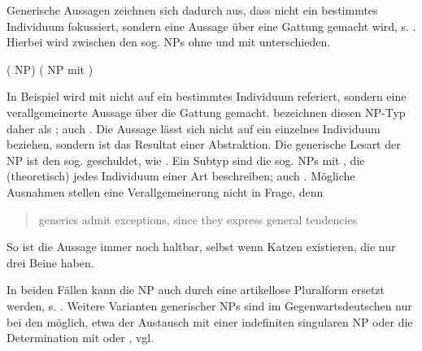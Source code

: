 
Generische Aussagen zeichnen sich dadurch aus, dass nicht ein bestimmtes Individuum fokussiert, sondern eine Aussage über eine Gattung gemacht wird, s.  \parencite[übersetzt und gekürzt aus][]{Krifka1995}. Hierbei wird zwischen den sog.  NPs ohne und mit  unterschieden.   

\begin{exe}
	\ex \label{ex:gener}   
	\begin{xlist}
		\ex \label{ex:sued} ( NP)
		\ex \label{ex:vitc}  ( NP mit )
		\end{xlist}
\end{exe}

In Beispiel  wird mit  nicht auf ein bestimmtes Individuum referiert, sondern eine verallgemeinerte Aussage über die Gattung  gemacht. \textcite[2]{Krifka1995} bezeichnen diesen NP-Typ daher als ; auch  \parencite[138]{Bisle-Muller1991}. Die Aussage lässt sich nicht auf ein einzelnes Individuum beziehen, sondern ist das Resultat einer Abstraktion. Die generische Lesart der NP ist den sog.  geschuldet, wie  \parencite{Krifka1995}. Ein Subtyp sind die sog.  NPs mit , die (theoretisch) jedes Individuum einer Art beschreiben; auch   \parencite[139f.]{Bisle-Muller1991}. Mögliche Ausnahmen stellen eine Verallgemeinerung nicht in Frage, denn  \blockcquote[179]{Lyons1999}{generics admit exceptions, since they express general tendencies}. So ist die Aussage   immer noch haltbar, selbst wenn Katzen existieren, die nur drei Beine haben.

In beiden Fällen kann die NP auch durch eine artikellose Pluralform ersetzt werden, s. . 
Weitere Varianten generischer NPs sind im Gegenwartsdeutschen nur bei den  möglich, etwa der Austausch mit einer indefiniten singularen NP oder die Determination mit  oder  \parencite[296]{Duden2009}, vgl.  

